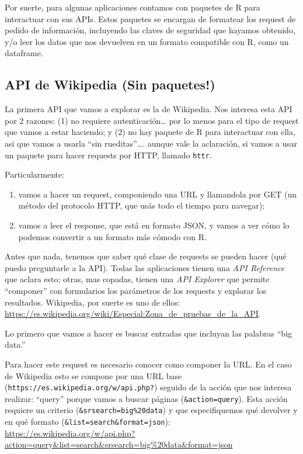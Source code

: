 \documentclass[
]{book}
\providecommand{\tightlist}{%
  \setlength{\itemsep}{0pt}\setlength{\parskip}{0pt}}
\begin{document}
Por suerte, para algunas aplicaciones contamos con paquetes de R para interactuar con sus APIs. Estos paquetes se encargan de formatear los request de pedido de información, incluyendo las claves de seguridad que hayamos obtenido, y/o leer los datos que nos devuelven en un formato compatible con R, como un dataframe.

\hypertarget{api-de-wikipedia-sin-paquetes}{%
\subsection{API de Wikipedia (Sin paquetes!)}\label{api-de-wikipedia-sin-paquetes}}

La primera API que vamos a explorar es la de Wikipedia.
Nos interesa esta API por 2 razones: (1) no requiere autenticación\ldots{} por lo menos para el tipo de request que vamos a estar haciendo;
y (2) no hay paquete de R para interactuar con ella, asi que vamos a usarla ``sin rueditas''\ldots. aunque vale la aclaración, si vamos a usar un paquete para hacer requests por HTTP, llamado \texttt{httr}.

Particularmente:

\begin{enumerate}
\def\labelenumi{\arabic{enumi}.}
\tightlist
\item
  vamos a hacer un request, componiendo una URL y llamandola por GET (un método del protocolo HTTP, que usás todo el tiempo para navegar);
\item
  vamos a leer el response, que está en formato JSON, y vamos a ver cómo lo podemos convertir a un formato más cómodo con R.
\end{enumerate}

Antes que nada, tenemos que saber qué clase de requests se pueden hacer (qué puedo preguntarle a la API). Todas las aplicaciones tienen una \emph{API Reference} que aclara esto; otras, mas copadas, tienen una \emph{API Explorer} que permite ``componer'' con formularios los parámetros de los requests y explorar los resultados. Wikipedia, por suerte es uno de ellos: \url{https://es.wikipedia.org/wiki/Especial:Zona_de_pruebas_de_la_API}.

Lo primero que vamos a hacer es buscar entradas que incluyan las palabras ``big data.''

Para hacer este request es necesario conocer como componer la URL. En el caso de Wikipedia esto se compone por una URL base (\texttt{https://es.wikipedia.org/w/api.php?}) seguido de la acción que nos interesa realizar: ``query'' porque vamos a buscar páginas (\texttt{\&action=query}).
Esta acción requiere un criterio (\texttt{\&srsearch=big\%20data}) y que especifiquemos qué devolver y en qué formato (\texttt{\&list=search\&format=json}):
\url{https://es.wikipedia.org/w/api.php?action=query\&list=search\&srsearch=big\%20data\&format=json}
\end{document}
